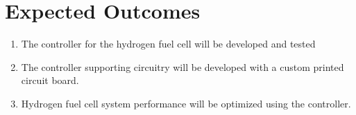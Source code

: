 \section{Expected Outcomes}
\begin{enumerate}
\item The controller for the hydrogen fuel cell will be developed and tested
\item The controller supporting circuitry will be developed with a custom printed circuit board.
\item Hydrogen fuel cell system performance will be optimized using the controller.
\end{enumerate}